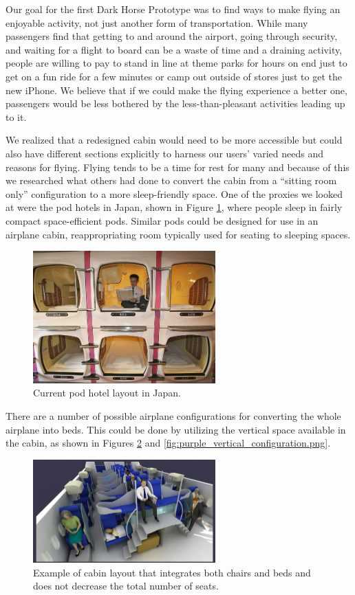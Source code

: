 Our goal for the first Dark Horse Prototype was to find ways to make flying an enjoyable activity, not just another form of transportation. While many passengers find that getting to and around the airport, going through security, and waiting for a flight to board can be a waste of time and a draining activity, people are willing to pay to stand in line at theme parks for hours on end just to get on a fun ride for a few minutes or camp out outside of stores just to get the new iPhone. We believe that if we could make the flying experience a better one, passengers would be less bothered by the less-than-pleasant activities leading up to it. 

We realized that a redesigned cabin would need to be more accessible but could also have different sections explicitly to harness our users' varied needs and reasons for flying. Flying tends to be a time for rest for many and because of this we researched what others had done to convert the cabin from a “sitting room only” configuration to a more sleep-friendly space. One of the proxies we looked at were the pod hotels in Japan, shown in Figure \ref{fig:hotel_pod.jpg}, where people sleep in fairly compact space-efficient pods. Similar pods could be designed for use in an airplane cabin, reappropriating room typically used for seating to sleeping spaces.

\begin{figure}[h]
  \centering
     \includegraphics[width=7cm]{images/hotel_pod.jpg}
   \caption{Current pod hotel layout in Japan. \cite{hotel_pod}}
  \label{fig:hotel_pod.jpg}
\end{figure}

There are a number of possible airplane configurations for converting the whole airplane into beds. This could be done by utilizing the vertical space available in the cabin, as shown in Figures \ref{fig:blue_vertical_configuration.png} and \ref{fig:purple_vertical_configuration.png}. 

\begin{figure}[h]
  \centering
     \includegraphics[width=7cm]{images/blue_vertical_configuration.png}
   \caption{Example of cabin layout that integrates both chairs and beds and does not decrease the total number of seats. \cite{blue_vertical} }
  \label{fig:blue_vertical_configuration.png}
\end{figure} 

